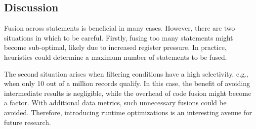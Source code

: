 
\subsection{Discussion}

Fusion across statements is beneficial in many cases. However, there
are two situations in which to be careful. Firstly,
fusing too many statements might become sub-optimal, likely due to increased
register pressure. In practice, heuristics could determine a maximum number of statements to be fused.

The second situation arises when filtering conditions have a high selectivity,
e.g., when only 10 out of a million records qualify. In this case, the benefit of
avoiding intermediate results is negligible, while the overhead of code fusion
might become a factor. 
With additional data metrics, such unnecessary fusions
could be avoided. Therefore, introducing runtime optimizations is an interesting avenue for future research.